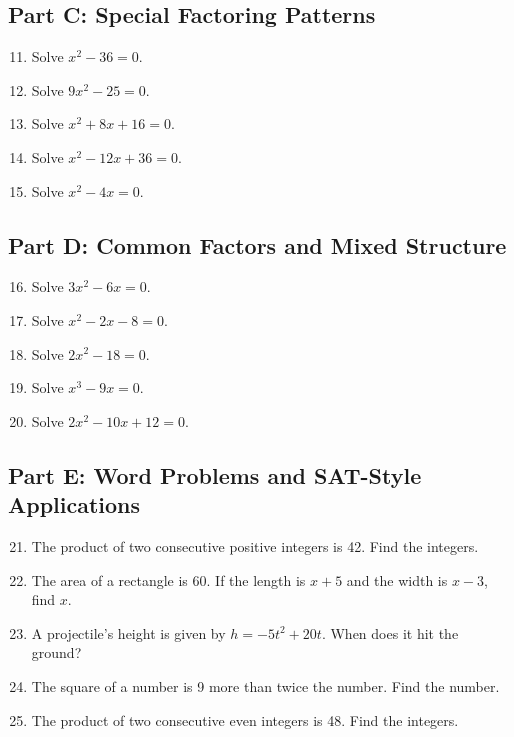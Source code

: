 \documentclass[14pt]{extarticle}
\begin{document}
\subsection*{Part C: Special Factoring Patterns}
\begin{enumerate}
  \setcounter{enumi}{10}
  \item Solve \(x^2 - 36 = 0.\)
  \item Solve \(9x^2 - 25 = 0.\)
  \item Solve \(x^2 + 8x + 16 = 0.\)
  \item Solve \(x^2 - 12x + 36 = 0.\)
  \item Solve \(x^2 - 4x = 0.\)
\end{enumerate}

\subsection*{Part D: Common Factors and Mixed Structure}
\begin{enumerate}
  \setcounter{enumi}{15}
  \item Solve \(3x^2 - 6x = 0.\)
  \item Solve \(x^2 - 2x - 8 = 0.\)
  \item Solve \(2x^2 - 18 = 0.\)
  \item Solve \(x^3 - 9x = 0.\)
  \item Solve \(2x^2 - 10x + 12 = 0.\)
\end{enumerate}

\subsection*{Part E: Word Problems and SAT-Style Applications}
\begin{enumerate}
  \setcounter{enumi}{20}
  \item The product of two consecutive positive integers is 42. Find the integers.
  \item The area of a rectangle is 60. If the length is \(x + 5\) and the width is \(x - 3\), find \(x.\)
  \item A projectile’s height is given by \(h = -5t^2 + 20t.\) When does it hit the ground?
  \item The square of a number is 9 more than twice the number. Find the number.
  \item The product of two consecutive even integers is 48. Find the integers.
\end{enumerate}

\newpage
\end{document}
